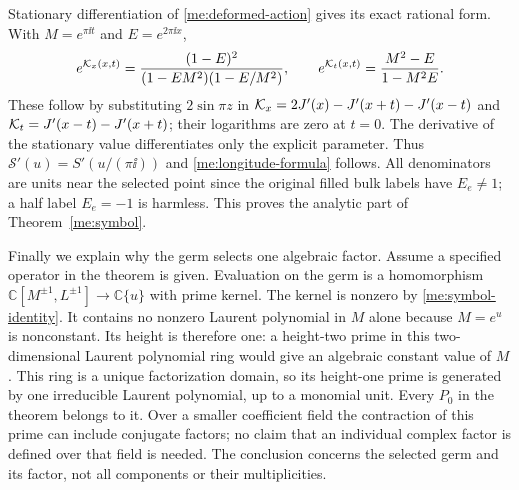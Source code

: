 Stationary differentiation of \eqref{me:deformed-action} gives
its exact rational form. With $M=e^{\pi\ii t}$ and
$E=e^{2\pi\ii x}$,
\begin{equation}\label{me:sine-ratios}
 e^{\mathcal K_x(x,t)}=\frac{(1-E)^2}{(1-EM^2)(1-E/M^2)},\qquad
 e^{\mathcal K_t(x,t)}=\frac{M^2-E}{1-M^2E}.
\end{equation}
These follow by substituting $2\sin\pi z$ in
$\mathcal K_x=2J'(x)-J'(x+t)-J'(x-t)$ and
$\mathcal K_t=J'(x-t)-J'(x+t)$; their logarithms are zero at $t=0$.
The derivative of the stationary value differentiates only the
explicit parameter. Thus
$\mathcal S'(u)=S'(u/(\pi\ii))$ and
\eqref{me:longitude-formula} follows. All denominators are units
near the selected point since the original filled bulk labels
have $E_e\ne1$; a half label $E_e=-1$ is harmless.
This proves the analytic part of Theorem~\ref{me:symbol}.

Finally we explain why the germ selects one algebraic factor.
Assume a specified operator in the theorem is given. Evaluation
on the germ is a homomorphism
$\mathbb C[M^{\pm1},L^{\pm1}]\to\mathbb C\{u\}$ with prime
kernel. The kernel is nonzero by \eqref{me:symbol-identity}.
It contains no nonzero Laurent polynomial in $M$ alone because
$M=e^u$ is nonconstant. Its height is therefore one: a height-two
prime in this two-dimensional Laurent polynomial ring would give
an algebraic constant value of $M$. This ring is a unique
factorization domain, so its height-one prime is generated by
one irreducible Laurent polynomial, up to a monomial unit.
Every $P_0$ in the theorem belongs to it. Over a smaller coefficient
field the contraction of this prime can include conjugate factors;
no claim that an individual complex factor is defined over that
field is needed. The conclusion concerns the selected germ and
its factor, not all components or their multiplicities.
